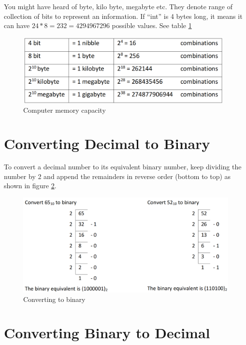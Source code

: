 \par You might have heard of byte, kilo byte, megabyte etc. They denote range of collection of bits to represent an information. If “int” is 4 bytes long, it means it can have $24*8 = 232 = 4294967296$ possible values. See table \ref{fig:memory_size}

\begin{figure}
    \centering
    \includegraphics[width=4.3in]{Tables/DTMF/computer_memory.png}
    \caption[Memory size]{Computer memory capacity}
    \label{fig:memory_size}
\end{figure}

\section{Converting Decimal to Binary}

To convert a decimal number to its equivalent binary number, keep dividing the number by 2 and append the remainders in reverse order (bottom to top) as shown in figure \ref{fig:dec_to_bin}.

\begin{figure}
    \centering
    \includegraphics{Images/DTMF/decimal_to_binary.png}
    \caption[Decimal to binary]{Converting to binary}
    \label{fig:dec_to_bin}
\end{figure}

\section{Converting Binary to Decimal}

